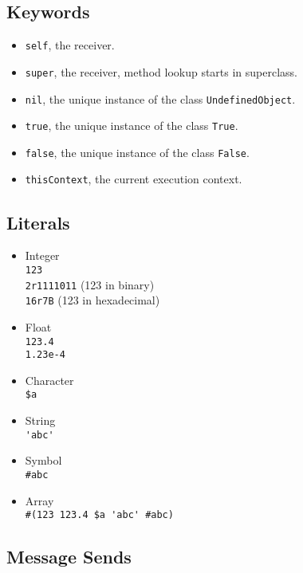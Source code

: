 \documentclass[8pt,a4paper]{leaflet}
\newcommand{\ct}{\lstinline[mathescape=false,basicstyle={\sffamily\upshape}]}
\begin{document}
\subsection{Keywords}

\begin{itemize}
	\item \ct{self},			the receiver.
	\item \ct{super},		the receiver, method lookup starts in superclass.
	\item \ct{nil},			the unique instance of the class \ct{UndefinedObject}.
	\item \ct{true},			the unique instance of the class \ct{True}.
	\item \ct{false},		the unique instance of the class \ct{False}.
	\item \ct{thisContext},	the current execution context.
\end{itemize}

\subsection{Literals}

\begin{itemize}
	\item Integer \\
	\ct{123} \\
	\ct{2r1111011} (123 in binary) \\
	\ct{16r7B} (123 in hexadecimal)
	
	\item Float \\
	\ct{123.4} \\
	\ct{1.23e-4}
	
	\item Character \\
	\ct{$a}
	
	\item String \\
	\ct{'abc'}
	
	\item Symbol \\
	\ct{#abc}
	
	\item Array \\
	\ct{#(123 123.4 $a 'abc' #abc)}
\end{itemize}

\subsection{Message Sends}
\end{document}
